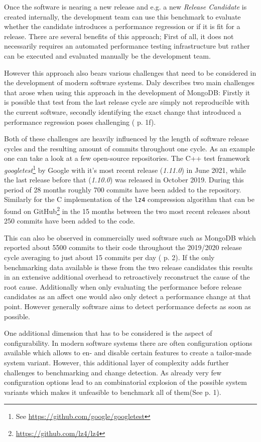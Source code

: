 \documentclass[	runningheads,
				a4paper]{llncs}
\begin{document}
	Once the software is nearing a new release and e.g. a new \textit{Release Candidate} is created internally, the development team can use this benchmark to evaluate whether the candidate introduces a performance regression or if it is fit for a release. There are several benefits of this approach; First of all, it does not necessarily requires an automated performance testing infrastructure but rather can be executed and evaluated manually be the development team. 

	However this approach also bears various challenges that need to be considered in the development of modern software systems. Daly describes two main challenges that arose when using this approach in the development of MongoDB: Firstly it is possible that test from the last release cycle are simply not reproducible with the current software, secondly identifying the exact change that introduced a performance regression poses challenging (\cite{daly2021} p. 1f).

	Both of these challenges are heavily influenced by the length of software release cycles and the resulting amount of commits throughout one cycle. As an example one can take a look at a few open-source repositories. The C++ test framework \textit{googletest}\footnote{See \url{https://github.com/google/googletest}} by Google with it's most recent release (\textit{1.11.0}) in June 2021, while the last release before that (\textit{1.10.0}) was released in October 2019. During this period of 28 months roughly 700 commits have been added to the repository. Similarly for the C implementation of the \texttt{lz4} compression algorithm that can be found on GitHub\footnote{\url{https://github.com/lz4/lz4}} in the 15 months between the two most recent releases about 250 commits have been added to the code.

	This can also be observed in commercially used software such as MongoDB which reported about 5500 commits to their code throughout the 2019/2020 release cycle averaging to just about 15 commits per day (\cite{daly2021} p. 2). If the only benchmarking data available is these from the two release candidates this results in an extensive additional overhead to retroactively reconstruct the cause of the root cause. Additionally when only evaluating the performance before release candidates as an affect one would also only detect a performance change at that point. However generally software aims to detect performance defects as soon as possible. 

	One additional dimension that has to be considered is the aspect of configurability. In modern software systems there are often configuration options available which allows to en- and disable certain features to create a tailor-made system variant. However, this additional layer of complexity adds further challenges to benchmarking and change detection. As already very few configuration options lead to an combinatorial explosion of the possible system variants which makes it unfeasible to benchmark all of them(See \cite{apel2020} p. 1).
\end{document}
